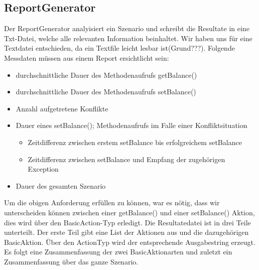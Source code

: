 \subsection{ReportGenerator}
\label{sec:reportGenerator}
Der ReportGenerator analyisiert ein Szenario und schreibt die Resultate in eine Txt-Datei, welche alle relevanten Information beinhaltet. Wir haben uns für eine Textdatei entschieden, da ein Textfile leicht lesbar ist(Grund???). Folgende Messdaten müssen aus einem Report ersichtlicht sein:
\begin{itemize}
\item durchschnittliche Dauer des Methodenaufrufs getBalance()
\item durchschnittliche Dauer des Methodenaufrufs setBalance()
\item Anzahl aufgetretene Konflikte
\item Dauer eines setBalance(); Methodenaufrufs im Falle einer Konfliktsituation
  \begin{itemize}
  \item Zeitdifferenz zwischen erstem setBalance bis erfolgreichem setBalance
  \item Zeitdifferenz zwischen setBalance und Empfang der zugehörigen Exception
  \end{itemize}
\item Dauer des gesamten Szenario
\end{itemize}

Um die obigen Anforderung erfüllen zu können, war es nötig, dass wir unterscheiden können zwischen einer getBalance() und einer setBalance() Aktion, dies wird über den BasicAction-Typ erledigt.
\newline
Die Resultatedatei ist in drei Teile unterteilt. Der erste Teil gibt eine List der Aktionen aus und die dazugehörigen BasicAktion. Über den ActionTyp wird der entsprechende Ausgabestring erzeugt. Es folgt eine Zusammenfassung der zwei BasicAktionarten und zuletzt ein Zusammenfassung über das ganze Szenario.





